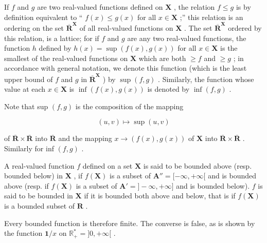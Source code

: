If \(f\) and \(g\) are two real-valued functions defined on \(\mathbf{X}\) , the relation \(f \leqslant g\) is by definition equivalent to `` \(f(x) \leqslant g(x)\) for all \(x \in \mathbf{X}\) ;'' this relation is an ordering on the set \(\overline{\mathbf{R}}^{\mathbf{X}}\) of all real-valued functions on \(\mathbf{X}\) . The set \(\overline{\mathbf{R}}^{\mathbf{X}}\) ordered by this relation, is a lattice; for if \(f\) and \(g\) are any two real-valued functions, the function \(h\) defined by \(h(x) = \sup (f(x), g(x))\) for all \(x \in \mathbf{X}\) is the smallest of the real-valued functions on \(\mathbf{X}\) which are both \(\geqslant f\) and \(\geqslant g\) ; in accordance with general notation, we denote this function (which is the least upper bound of \(f\) and \(g\) in \(\overline{\mathbf{R}}^{\mathbf{X}}\) ) by \(\sup (f, g)\) . Similarly, the function whose value at each \(x \in \mathbf{X}\) is \(\inf (f(x), g(x))\) is denoted by \(\inf (f, g)\) .

Note that sup \((f, g)\) is the composition of the mapping

\[
(u, v) \mapsto \sup (u, v)
\]

of \(\overline{\mathbf{R}}\times \overline{\mathbf{R}}\) into \(\overline{\mathbf{R}}\) and the mapping \(x\to (f(x),g(x))\) of \(\mathbf{X}\) into \(\overline{\mathbf{R}}\times \overline{\mathbf{R}}\) . Similarly for inf \((f,g)\) .

A real-valued function \(f\) defined on a set \(\mathbf{X}\) is said to be bounded above (resp. bounded below) in \(\mathbf{X}\) , if \(f(\mathbf{X})\) is a subset of \(\mathbf{A}'' = [-\infty, +\infty[\) and is bounded above (resp. if \(f(\mathbf{X})\) is a subset of \(\mathbf{A}' = ] - \infty, +\infty]\) and is bounded below). \(f\) is said to be bounded in \(\mathbf{X}\) if it is bounded both above and below, that is if \(f(\mathbf{X})\) is a bounded subset of \(\mathbf{R}\) .

Every bounded function is therefore finite. The converse is false, as is shown by the function \(\mathbf{1} / x\) on \(\mathbb{R}_+^* = ]0, +\infty[\) .
